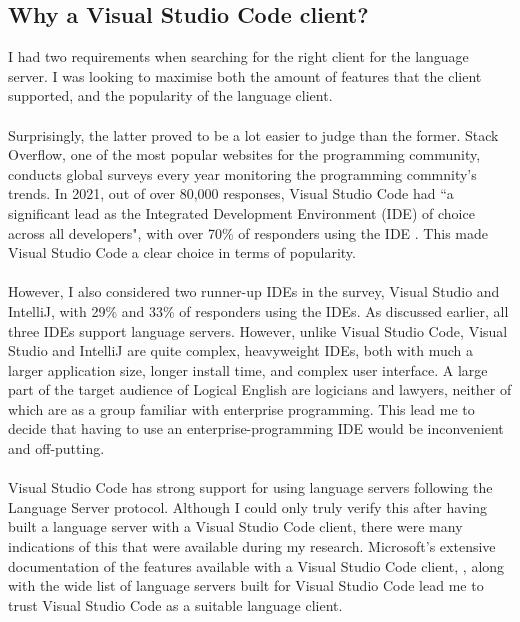 \documentclass[../main.tex]{subfiles}
\begin{document}
\subsection{Why a Visual Studio Code client?}
I had two requirements when searching for the right client for the language server. I was looking to maximise both the amount of features that the client supported, and the popularity of the language client. 
\\
\\
Surprisingly, the latter proved to be a lot easier to judge than the former. Stack Overflow, one of the most popular websites for the programming community, conducts global surveys every year monitoring the programming commnity's trends. In 2021, out of over 80,000 responses, Visual Studio Code had ``a significant lead as the Integrated Development Environment (IDE) of choice across all developers", with over 70\% of responders using the IDE  \cite{ide_rankings}. This made Visual Studio Code a clear choice in terms of popularity. 
\\
\\
However, I also considered two runner-up IDEs in the survey, Visual Studio and IntelliJ, with 29\% and 33\% of responders using the IDEs. As discussed earlier, all three IDEs support language servers. However, unlike Visual Studio Code, Visual Studio and IntelliJ are quite complex, heavyweight IDEs, both with much a larger application size, longer install time, and complex user interface. A large part of the target audience of Logical English are logicians and lawyers, neither of which are as a group familiar with enterprise programming. This lead me to decide that having to use an enterprise-programming IDE would be inconvenient and off-putting. 
\\
\\
Visual Studio Code has strong support for using language servers following the Language Server protocol. Although I could only truly verify this after having built a language server with a Visual Studio Code client, there were many indications of this that were available during my research. Microsoft's extensive documentation of the features available with a Visual Studio Code client, \cite{vsc_langserver_features}, along with the wide list of language servers built for Visual Studio Code \cite{open_source_language_servers} lead me to trust Visual Studio Code as a suitable language client. 
\end{document}
